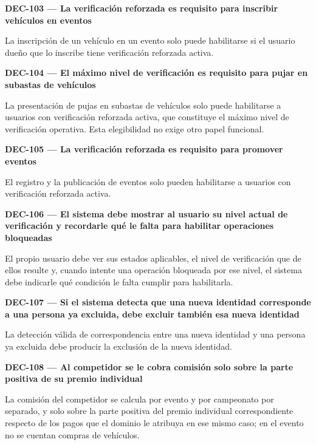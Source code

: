 \documentclass[10pt,letterpaper]{article}
\begin{document}
\noindent\textbf{DEC-103 --- La verificación reforzada es requisito para inscribir vehículos en eventos}\par
La inscripción de un vehículo en un evento solo puede habilitarse si el usuario dueño que lo inscribe tiene verificación reforzada activa.\par\vspace{0.45em}
\noindent\textbf{DEC-104 --- El máximo nivel de verificación es requisito para pujar en subastas de vehículos}\par
La presentación de pujas en subastas de vehículos solo puede habilitarse a usuarios con verificación reforzada activa, que constituye el máximo nivel de verificación operativa. Esta elegibilidad no exige otro papel funcional.\par\vspace{0.45em}
\noindent\textbf{DEC-105 --- La verificación reforzada es requisito para promover eventos}\par
El registro y la publicación de eventos solo pueden habilitarse a usuarios con verificación reforzada activa.\par\vspace{0.45em}
\noindent\textbf{DEC-106 --- El sistema debe mostrar al usuario su nivel actual de verificación y recordarle qué le falta para habilitar operaciones bloqueadas}\par
El propio usuario debe ver sus estados aplicables, el nivel de verificación que de ellos resulte y, cuando intente una operación bloqueada por ese nivel, el sistema debe indicarle qué condición le falta cumplir para habilitarla.\par\vspace{0.45em}
\noindent\textbf{DEC-107 --- Si el sistema detecta que una nueva identidad corresponde a una persona ya excluida, debe excluir también esa nueva identidad}\par
La detección válida de correspondencia entre una nueva identidad y una persona ya excluida debe producir la exclusión de la nueva identidad.\par\vspace{0.45em}
\noindent\textbf{DEC-108 --- Al competidor se le cobra comisión solo sobre la parte positiva de su premio individual}\par
La comisión del competidor se calcula por evento y por campeonato por separado, y solo sobre la parte positiva del premio individual correspondiente respecto de los pagos que el dominio le atribuya en ese mismo caso; en el evento no se cuentan compras de vehículos.\par\vspace{0.45em}
\end{document}
